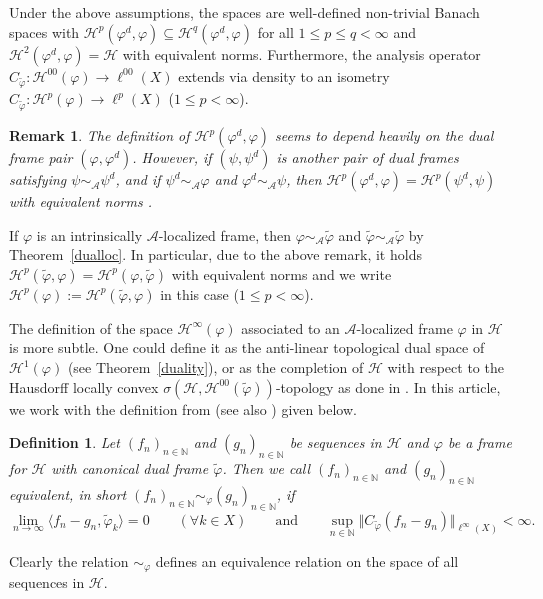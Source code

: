 \documentclass{amsart}
\newtheorem{def.}[theorem]{Definition}
\newtheorem{rem.}[theorem]{Remark}
\def\Hil{\mathcal{H}}
\newcommand{\N}[0]{{\mathbb{N}}}
\newcommand{\A}[0]{{\mathcal{A}}}
\renewcommand{\H}{{\mathcal{H}}}
\begin{document}
Under the above assumptions, the spaces are well-defined non-trivial Banach spaces with $\H^p (\varphi^d,\varphi) \subseteq \H^q (\varphi^d,\varphi)$ for all $1\leq p\leq q <\infty$ and $\H^2 (\varphi^d,\varphi) = \Hil$ with equivalent norms. Furthermore, the analysis operator $C_{\widetilde\varphi}:\Hil^{00}(\varphi)\to \ell^{00}(X)$ extends via density to an isometry $C_{\widetilde\varphi}:\Hil^{p}(\varphi)\to \ell^{p}(X)$ ($1\leq p < \infty$). 

\begin{rem.}\label{indep}
The definition of $\H^p (\varphi^d,\varphi)$ seems to depend heavily on the dual frame pair $(\varphi,\varphi^d)$. However, if $(\psi,\psi^d)$ is another pair of dual frames satisfying $\psi \sim_{\A} \psi^d$, and if $\psi^d \sim_{\A} \varphi$ and $\varphi^d \sim_{\A} \psi$, then $\Hil^p(\varphi^d,\varphi) = \Hil^p(\psi^d,\psi)$ with equivalent norms \cite[Theorem~3.25]{koeba24}. %
\end{rem.}

If $\varphi$ is an intrinsically $\A$-localized frame, then $\varphi \sim_{\A}\widetilde{\varphi}$ and $\widetilde{\varphi} \sim_{\A}\widetilde{\varphi}$ by Theorem~\ref{dualloc}. In particular, due to the above remark, it holds $\Hil^p(\widetilde{\varphi},\varphi) = \Hil^p(\varphi,\widetilde{\varphi})$ with equivalent norms and we write $\Hil^p(\varphi):= \Hil^p(\widetilde{\varphi},\varphi)$ in this case ($1\leq p < \infty$).

The definition of the space $\Hil^{\infty}(\varphi)$ associated to an $\A$-localized frame $\varphi$ in $\Hil$ is more subtle. One could define it as the anti-linear topological dual space of $\Hil^{1}(\varphi)$ (see Theorem~\ref{duality}), or as the completion of $\Hil$ with respect to the Hausdorff locally convex $\sigma(\Hil,\Hil^{00}(\widetilde\varphi))$-topology as done in \cite{forngroech1,groe04}. In this article, we work with the definition from \cite{xxlgro14} (see also \cite{koeba24}) given below. 

\begin{def.}{\label{ERHw}}\cite{xxlgro14,koeba24}
Let $( f_n )_{n\in\N}$ and $( g_n )_{n\in\N}$ be sequences in $\Hil$ and $\varphi$ be a frame for $\Hil$ with canonical dual frame $\widetilde{\varphi}$. Then we call $ ( f_n )_{n\in\N}$ and $( g_n )_{n\in\N}$ equivalent, in short $( f_n  )_{n\in\N} \sim_{\varphi}  (g_n )_{n\in\N}$, if  
$$\lim_{n\rightarrow \infty}  \langle f_n-g_n, \widetilde{\varphi}_k \rangle = 0 \qquad (\forall k\in X) \qquad \text{and} \qquad \sup_{n\in \mathbb{N}}\Vert C_{\widetilde\varphi}(f_n - g_n) \Vert_{\ell^{\infty}(X)} < \infty .$$
\end{def.}
Clearly the relation $\sim_{\varphi}$ defines an equivalence relation on the space of all sequences in $\Hil$.
\end{document}

